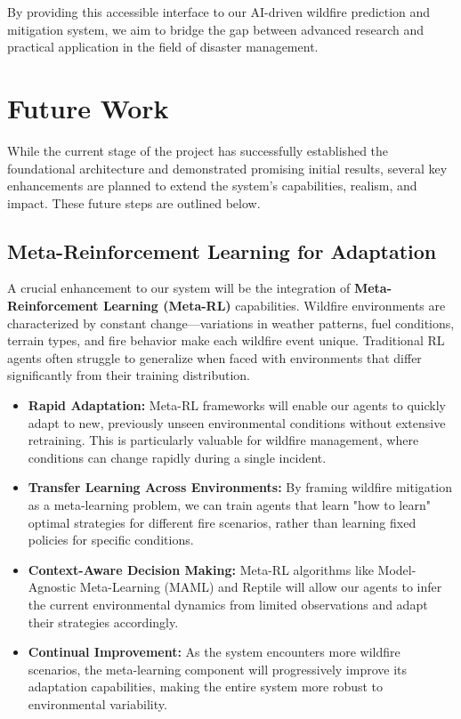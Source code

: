 \documentclass[conference]{IEEEtran}
\begin{document}
\noindent
By providing this accessible interface to our AI-driven wildfire prediction and mitigation system, we aim to bridge the gap between advanced research and practical application in the field of disaster management.

\section{Future Work}

While the current stage of the project has successfully established the foundational architecture and demonstrated promising initial results, several key enhancements are planned to extend the system's capabilities, realism, and impact. These future steps are outlined below.

\subsection{Meta-Reinforcement Learning for Adaptation}
A crucial enhancement to our system will be the integration of \textbf{Meta-Reinforcement Learning (Meta-RL)} capabilities. Wildfire environments are characterized by constant change—variations in weather patterns, fuel conditions, terrain types, and fire behavior make each wildfire event unique. Traditional RL agents often struggle to generalize when faced with environments that differ significantly from their training distribution.

\begin{itemize}
\item \textbf{Rapid Adaptation:} Meta-RL frameworks will enable our agents to quickly adapt to new, previously unseen environmental conditions without extensive retraining. This is particularly valuable for wildfire management, where conditions can change rapidly during a single incident.

\item \textbf{Transfer Learning Across Environments:} By framing wildfire mitigation as a meta-learning problem, we can train agents that learn "how to learn" optimal strategies for different fire scenarios, rather than learning fixed policies for specific conditions.

\item \textbf{Context-Aware Decision Making:} Meta-RL algorithms like Model-Agnostic Meta-Learning (MAML) and Reptile will allow our agents to infer the current environmental dynamics from limited observations and adapt their strategies accordingly.

\item \textbf{Continual Improvement:} As the system encounters more wildfire scenarios, the meta-learning component will progressively improve its adaptation capabilities, making the entire system more robust to environmental variability.
\end{itemize}
\end{document}
